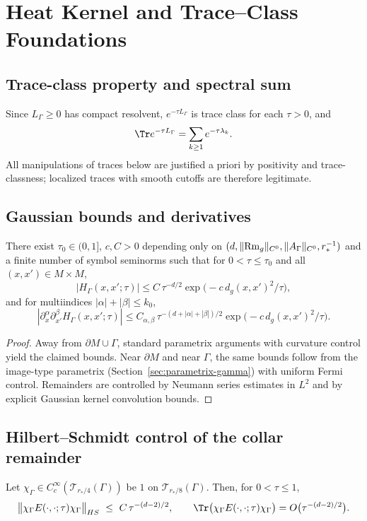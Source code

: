 \section{Heat Kernel and Trace–Class Foundations}
\label{sec:heat-trace-prep}

\subsection{Trace-class property and spectral sum}
Since $L_\Gamma\ge0$ has compact resolvent, $e^{-\tau L_\Gamma}$ is trace class for each $\tau>0$, and
\[
\Tr e^{-\tau L_\Gamma}=\sum_{k\ge1} e^{-\tau\lambda_k}.
\]
All manipulations of traces below are justified a priori by positivity and trace-classness; localized traces with smooth cutoffs are therefore legitimate.

\subsection{Gaussian bounds and derivatives}
\begin{proposition}
\label{prop:gaussian-bounds}
There exist $\tau_0\in(0,1]$, $c,C>0$ depending only on $(d,\|{\rm Rm}_g\|_{C^0},\|A_\Gamma\|_{C^0},r_*^{-1})$ and a finite number of symbol seminorms such that for $0<\tau\le \tau_0$ and all $(x,x')\in M\times M$,
\[
|H_\Gamma(x,x';\tau)| \le C\,\tau^{-d/2}\exp\!\big(-c\,d_g(x,x')^2/\tau\big),
\]
and for multiindices $|\alpha|+|\beta|\le k_0$,
\[
|\partial_x^\alpha \partial_{x'}^\beta H_\Gamma(x,x';\tau)|
\le C_{\alpha,\beta}\,\tau^{-(d+|\alpha|+|\beta|)/2}\exp\!\big(-c\,d_g(x,x')^2/\tau\big).
\]
\end{proposition}

\begin{proof}[Proof]
Away from $\partial M\cup\Gamma$, standard parametrix arguments with curvature control yield the claimed bounds. 
Near $\partial M$ and near $\Gamma$, the same bounds follow from the image-type parametrix (Section~\ref{sec:parametrix-gamma}) with uniform Fermi control. Remainders are controlled by Neumann series estimates in $L^2$ and by explicit Gaussian kernel convolution bounds.
\end{proof}

\subsection{Hilbert–Schmidt control of the collar remainder}
\begin{corollary}
\label{cor:HS-wall}
Let $\chi_\Gamma\in C_c^\infty(\mathcal T_{r_*/4}(\Gamma))$ be $1$ on $\mathcal T_{r_*/8}(\Gamma)$. Then, for $0<\tau\le1$,
\[
\big\|\chi_\Gamma E(\cdot,\cdot;\tau)\chi_\Gamma\big\|_{HS}
\ \le\ C\,\tau^{-(d-2)/2},\qquad
\Tr\big(\chi_\Gamma E(\cdot,\cdot;\tau)\chi_\Gamma\big)
=O\big(\tau^{-(d-2)/2}\big).
\]
\end{corollary}

